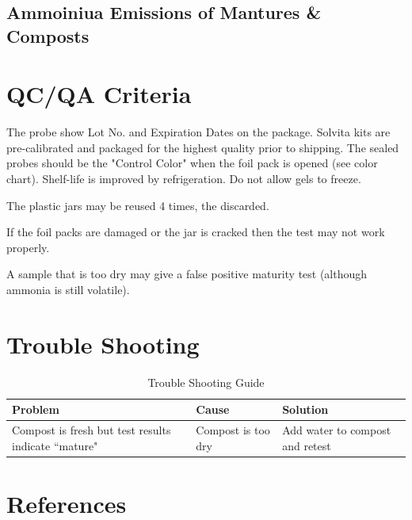 \documentclass[12pt]{../SOP4_alpha}\usepackage[]{graphicx}\usepackage[]{xcolor}
\begin{document}
\subsection{Ammoiniua Emissions of Mantures \& Composts}

\section{QC/QA Criteria}

\NP The probe show Lot No. and Expiration Dates on the package. Solvita kits are pre-calibrated and packaged for the highest quality prior to shipping. The sealed probes should be the "Control Color" when the foil pack is opened (see color chart).  Shelf-life is improved by refrigeration. Do not allow gels to freeze. 

\NP The plastic jars may be reused 4 times, the discarded. 

\NP If the foil packs are damaged or the jar is cracked then the test may not work properly.

\NP A sample that is too dry may give a false positive maturity test (although ammonia is still volatile).

\section{Trouble Shooting}

\begin{table}[ht]
\centering
\caption{Trouble Shooting Guide}
\begin{tabular}{p{5cm}p{5cm}p{5cm}} \hline
\textbf{Problem} & \textbf{Cause} & \textbf{Solution} \\ \hline \hline
Compost is fresh but test results indicate ``mature"& 
Compost is too dry & 
Add water to compost and retest \\


\end{tabular}
\end{table}

\section{References}




\end{document}

